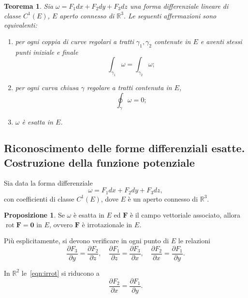 \documentclass[a4paper]{book}
\DeclareMathOperator{\rot}{rot}
\numberwithin{equation}{section}
\theoremstyle{plain}
\newtheorem{teor}{Teorema}[section]
\theoremstyle{definition}
\newtheorem{prop}{Proposizione}[section]
\theoremstyle{remark}
\renewcommand{\vec}{\boldsymbol}
\theoremstyle{example}
\begin{document}
\begin{teor}
Sia $\omega = F_1dx + F_2dy + F_3dz$ una forma differenziale lineare di classe $C^1(E)$, $E$ aperto connesso di $\mathbb{R}^3$. Le seguenti affermazioni sono equivalenti:
	\begin{enumerate}
	\item per ogni coppia di curve regolari a tratti $\gamma_1, \gamma_2$ contenute in $E$ e aventi stessi punti iniziale e finale
		\begin{equation*}
		\int_{\gamma_1}\omega = \int_{\gamma_2}\omega;
		\end{equation*}
	\item per ogni curva chiusa $\gamma$ regolare a tratti contenuta in $E$,
		\begin{equation*}
		\oint_{\gamma} \omega = 0;
		\end{equation*}
	\item $\omega$ è esatta in $E$.
	\end{enumerate}
\end{teor}

\subsection{Riconoscimento delle forme differenziali esatte. Costruzione della funzione potenziale}
Sia data la forma differenziale
	\begin{equation*}
	\omega = F_1dx + F_2 dy + F_3dz,
	\end{equation*}
con coefficienti di classe $C^1(E)$, dove $E$ è un aperto connesso di $\mathbb{R}^3$.

\begin{prop}
Se $\omega$ è esatta in $E$ ed $\vec{F}$ è il campo vettoriale associato, allora $\rot{\vec{F}} = \vec{0}$ in $E$, ovvero $\vec{F}$ è irrotazionale in $E$.
\end{prop}

Più esplicitamente, si devono verificare in ogni punto di $E$ le relazioni
	\begin{equation}
	\label{eqn:irrot}
	\frac{\partial F_3}{\partial y} = \frac{\partial F_2}{\partial z}, \quad \frac{\partial F_1}{\partial z} = \frac{\partial F_3}{\partial x}, \quad \frac{\partial F_2}{\partial x} = \frac{\partial F_1}{\partial y}.
	\end{equation}

In $\mathbb{R}^2$ le~\eqref{eqn:irrot} si riducono a
	\begin{equation}
	\frac{\partial F_2}{\partial x} = \frac{\partial F_1}{\partial y}.
	\end{equation}
\end{document}
